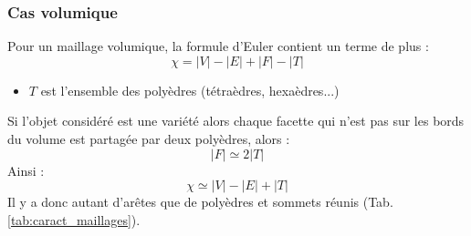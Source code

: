 \subsubsection{Cas volumique}
\noindent
Pour un maillage volumique, la formule d'Euler contient un terme de plus :\\
\begin{equation}
\chi = |V|-|E|+|F|-|T|
\end{equation}
\begin{itemize}
\item $T$ est l'ensemble des polyèdres (tétraèdres, hexaèdres...)\\
\end{itemize}
Si l'objet considéré est une variété alors chaque facette qui n'est pas sur les bords du volume est partagée par deux polyèdres, alors :\\
\begin{equation}
|F|\simeq 2|T|
\end{equation}
Ainsi :
\begin{equation}
\chi \simeq |V|-|E|+|T|
\end{equation}
Il y a donc autant d'arêtes que de polyèdres et sommets réunis (Tab. \ref{tab:caract_maillages}).

